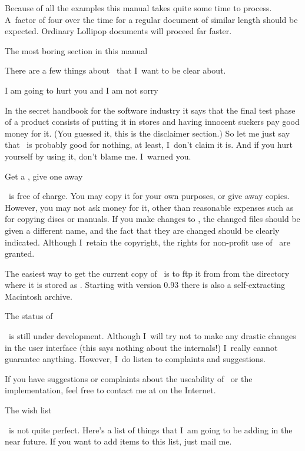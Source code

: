 Because of all the examples this manual takes quite some time to
process. A~factor of four over the time for a regular document of
similar length should be expected. Ordinary Lollipop documents will
proceed far faster.

\Section The most boring section in this manual

There are a few things about \Lollipop\ that I~want to be clear about.

\SubSection I am going to hurt you and I am not sorry

In the secret handbook for the software industry it says that the
final test phase of a product consists of putting it in stores and
having innocent suckers pay good money for it. (You guessed it, this
is the disclaimer section.) So let me just say that 
\Lollipop\ is probably good for nothing, at least, I~don't claim it
is. And if you hurt yourself by using it, don't blame me. I~warned
you.

\SubSection Get a \Lollipop, give one away

\Lollipop\ is free of charge. You may copy it
for your own purposes, or give away copies. However, you may not ask
money for it, other than reasonable expenses such as for copying discs
or manuals. If you make changes to \Lollipop, the changed files
should be given a different name, and the fact that they are changed
should be clearly indicated. Although I~retain the copyright, the
rights for non-profit use of \Lollipop\ are granted.

The easiest way to get the current copy of \Lollipop\ is to ftp it
from  from the directory  where it
is stored as . Starting with version 0.93 there
is also a self-extracting Macintosh archive.

\SubSection The status of \Lollipop

\Lollipop\ is still under development. Although I~will try not to
make any drastic changes in the user interface (this says nothing
about the internals!) I~really cannot guarantee anything.
However, I~do listen to complaints and suggestions. 

If you have suggestions or complaints about the
useability of \Lollipop\ or the implementation, feel free to contact
me at  on the Internet. 

 The wish list

\Lollipop\ is not quite perfect. Here's a list of things that I~am
going to be adding in the near future. If you want to add items to
this list, just mail me.

